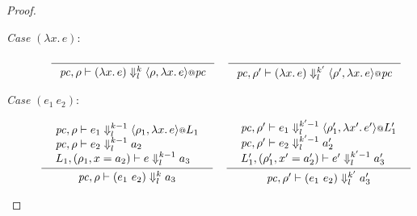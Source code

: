 \documentclass{article}
\makeatletter
\theoremstyle{definition}
\newcommand{\at}{\ensuremath{{\scriptstyle{@}}}}
\newcommand{\pc}{\ensuremath{{\mathit{pc}}}}
\makeatother
\begin{document}
\begin{proof}
\begin{description}
    
  \item[\emph{Case} $(\lambda{x}.\, e)$:]
    \begin{gather*}
      \inference{}{
        \pc, \rho |- (\lambda{x}.\, e) \Downarrow^{k}_{l}
        \langle{\rho, \lambda{x}.\, e\rangle} \at \pc
      }
      \quad
      \inference{}{
        \pc, \rho' |- (\lambda{x}.\, e) \Downarrow^{k'}_{l}
        \langle{\rho', \lambda{x}.\, e\rangle} \at \pc
      }
    \end{gather*}
    
  \item[\emph{Case} $(e_1\ e_2)$:]
    \begin{gather*}
      \inference{
        {\begin{array}{l}
            \pc, \rho |- e_1 \Downarrow^{k-1}_{l}
            \langle{\rho_1, \lambda{x}.\, e\rangle} \at L_1
            \\
            \pc, \rho |- e_2 \Downarrow^{k-1}_{l} a_2
            \\
            L_1, (\rho_1, x = a_2) |- e \Downarrow^{k-1}_{l} a_3
          \end{array}}
      }{
        \pc, \rho |- (e_1\ e_2) \Downarrow^{k}_{l} a_3
      }
      \quad
      \inference{
        {\begin{array}{l}
            \pc, \rho' |- e_1 \Downarrow^{k'-1}_{l}
            \langle{\rho_1', \lambda{x'}.\, e'\rangle} \at L_1'
            \\
            \pc, \rho' |- e_2 \Downarrow^{k'-1}_{l} a_2'
            \\
            L_1', (\rho_1', x' = a_2') |- e' \Downarrow^{k'-1}_{l} a_3'
          \end{array}}
      }{
        \pc, \rho' |- (e_1\ e_2) \Downarrow^{k'}_{l} a_3'
      }
    \end{gather*}
    

\end{description}
\end{proof}
\end{document}
